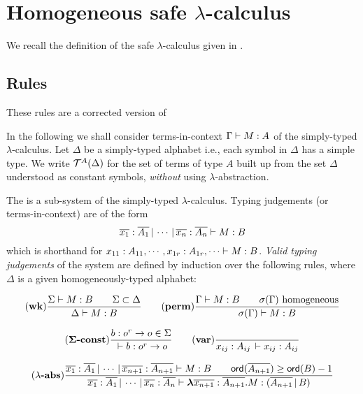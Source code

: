 \section{Homogeneous safe $\lambda$-calculus}
\label{sec:safe_alt}

We recall the definition of the safe $\lambda$-calculus given in
\cite{Ong2005}.

\subsection{Rules}

These rules are a corrected version of
\cite{DBLP:conf/fossacs/AehligMO05}

In the following we shall consider terms-in-context ${{\Gamma} \vdash {M
: A}}$ of the simply-typed $\lambda$-calculus. Let $\Delta$ be a
simply-typed alphabet i.e., each symbol in $\Delta$ has a simple
type. We write ${\cal T}^{A}(\Delta)$ for the set of terms of type $A$
built up from the set $\Delta$ understood as constant symbols,
\emph{without} using $\lambda$-abstraction.


The  is a sub-system of the
simply-typed $\lambda$-calculus. Typing judgements (or
terms-in-context) are of the form
\begin{equation}
\nonumber {{\overline{x_1}:\overline{A_1} \, | \, \cdots \, | \,
\overline{x_n} :  \overline{A_n}} \vdash {M : B}}
\end{equation}
which is shorthand for ${{x_{11} : A_{11}, \cdots, x_{1r}:
A_{1r}, \cdots} \vdash {M : B}}$. \emph{Valid typing judgements} of the
system are defined by induction over the following rules, where
$\Delta$ is a given homogeneously-typed alphabet:

$$ \mathbf{(wk)}
    {    { {{\Sigma} \vdash {M:B}} \qquad {\Sigma \subset \Delta} }
    \over
        { {{\Delta } \vdash {M : B}}}
   }
\qquad
    \mathbf{(perm)}
    {
      { {{\Gamma} \vdash {M:B}} \qquad \sigma(\Gamma) \hbox{ homogeneous} }
    \over
      { {{\sigma(\Gamma)} \vdash {M : B}} }
    }
$$


$$ \mathbf{(\Sigma\mbox{\textbf{-const}})}    {   {b : o^r \rightarrow o \in \Sigma } \over {{{} \vdash {b : o^r \rightarrow o}}}}
\qquad
 \mathbf{(var)} { \over {{{x_{ij} : A_{ij}\, } \vdash {x_{ij} : A_{ij}}}}}
$$

$$ \mathbf{(\lambda\mbox{\textbf{-abs}})}
{ {{{\overline{x_1} : \overline{A_1}\, | \, \cdots\, | \,
\overline{x_{n+1}} : \overline{A_{n+1}}} \vdash {M : B}}} \qquad
{\sf ord}(\overline{A_{n+1}}) \geq {\sf ord}(B) -1 \over {{{\overline{x_1} :
\overline{A_1}\, | \, \cdots\, | \, \overline{x_{n}} :
\overline{A_{n}}} \vdash {{\hbox{\boldmath $\lambda$}{\overline{x_{n+1}} : \overline{A_{n+1}}}.{M}}
: (\overline{A_{n+1}} \, | \, B)}}} } $$

